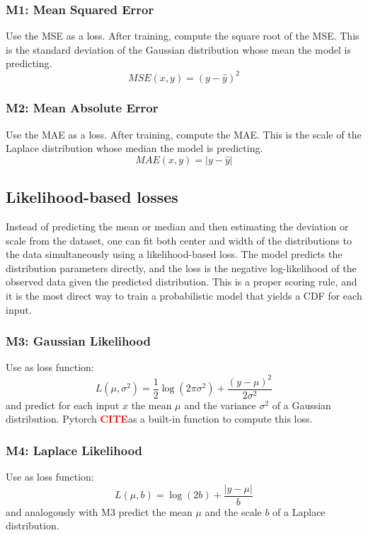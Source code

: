 \documentclass{article}
\newcommand{\citee}[1]{\textbf{\textcolor{red}{CITE}}}
\begin{document}
\subsubsection{M1: Mean Squared Error}
Use the MSE as a loss. After training, compute the square root of the MSE. This is the standard deviation of the Gaussian distribution whose mean the model is predicting. 
\begin{equation}
    MSE(x, y) = (y - \hat{y})^2
\end{equation}

\subsubsection{M2: Mean Absolute Error}
Use the MAE as a loss. After training, compute the MAE. This is the scale of the Laplace distribution whose median the model is predicting.
\begin{equation}
    MAE(x, y) = |y - \hat{y}|
\end{equation}

\subsection{Likelihood-based losses}
Instead of predicting the mean or median and then estimating the deviation or scale from the dataset, one can fit both center and width of the distributions to the data simultaneously using a likelihood-based loss. The model predicts the distribution parameters directly, and the loss is the negative log-likelihood of the observed data given the predicted distribution. This is a proper scoring rule, and it is the most direct way to train a probabilistic model that yields a CDF for each input.

\subsubsection{M3: Gaussian Likelihood}
Use as loss function:
\begin{equation}
    L(\mu, \sigma^2) = \frac{1}{2}\log(2\pi\sigma^2) + \frac{(y - \mu)^2}{2\sigma^2}
\end{equation}
and predict for each input $x$ the mean $\mu$ and the variance $\sigma^2$ of a Gaussian distribution.
Pytorch \citee has a built-in function to compute this loss.

\subsubsection{M4: Laplace Likelihood}
Use as loss function:
\begin{equation}
    L(\mu, b) = \log(2b) + \frac{|y - \mu|}{b}
\end{equation}  
and analogously with M3 predict the mean $\mu$ and the scale $b$ of a Laplace distribution.
\end{document}
